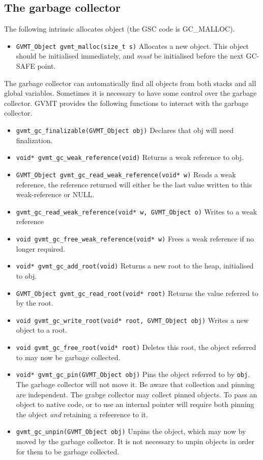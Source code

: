\subsection{The garbage collector\label{sect:user-roots}}

The following intrinsic allocates object (the GSC code is GC\_MALLOC).
\begin{itemize}
\item \verb|GVMT_Object gvmt_malloc(size_t s)| Allocates a new object. This object should be initialised immediately, and \emph{must} be initialised before the next GC-SAFE point.
\end{itemize}

The garbage collector can automatically find all objects from both stacks and all global variables. Sometimes it is necessary to have some control over the garbage collector.
GVMT provides the following functions to interact with the garbage collector.
\begin{itemize}
\item \verb|gvmt_gc_finalizable(GVMT_Object obj)| Declares that obj will need finalization.
\item \verb|void* gvmt_gc_weak_reference(void)| Returns a weak reference to obj.
\item \verb|GVMT_Object gvmt_gc_read_weak_reference(void* w)| Reads a weak reference, the reference returned will either be the last value written to this weak-reference or NULL.
\item \verb|gvmt_gc_read_weak_reference(void* w, GVMT_Object o)| Writes to a weak reference
\item \verb|void gvmt_gc_free_weak_reference(void* w)| Frees a weak reference if no longer required.
\item \verb|void* gvmt_gc_add_root(void)| Returns a new root to the heap, initialised to obj.
\item \verb|GVMT_Object gvmt_gc_read_root(void* root)| Returns the value referred to by the root.
\item \verb|void gvmt_gc_write_root(void* root, GVMT_Object obj)| Writes a new object to a root.
\item \verb|void gvmt_gc_free_root(void* root)| Deletes this root, the object referred to may now be garbage collected.

\item \verb|void* gvmt_gc_pin(GVMT_Object obj)| Pins the object referred to by \verb|obj|. The garbage collector will not move it. Be aware that collection and pinning are independent. The grabge collector may collect pinned objects. To pass an object to native code, or to use an internal pointer will require both pinning the object \emph{and} retaining a refeerence to it.
\item \verb|gvmt_gc_unpin(GVMT_Object obj)| Unpins the object, which may now by moved by the garbage collector. It is not necessary to unpin objects in order for them to be garbage collected.

\end{itemize}

